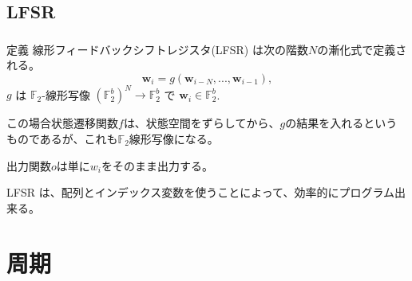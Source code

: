 \documentclass[cjk, dvips, handout, trans, xcolor=dvipsnames]{beamer}
\def\F2{{\mathbb F}_2}
\def\bw{{{\mathbf w}}}
\begin{document}
\subsection{LFSR}
\begin{frame}[t]
  \frametitle{\insertsubsection}

  \begin{block}{定義}
    線形フィードバックシフトレジスタ(LFSR) は次の階数$N$の漸化式で定義される。
    \[
    \bw_i = g(\bw_{i-N}, ..., \bw_{i-1}),
    \]
    $g$ は $\F2$-線形写像 $(\F2^{b})^N \rightarrow \F2^b$
    で $\bw_i \in \F2^b$.
  \end{block}

  この場合状態遷移関数$f$は、状態空間をずらしてから、$g$の結果を入れるという
  ものであるが、これも$\F2$線形写像になる。

  出力関数$o$は単に$w_i$をそのまま出力する。

  LFSR は、配列とインデックス変数を使うことによって、効率的にプログラム出来る。

\end{frame}

\section{周期}
\end{document}
